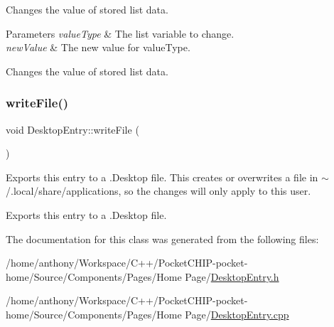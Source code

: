 Changes the value of stored list data.


\begin{DoxyParams}{Parameters}
{\em value\+Type} & The list variable to change.\\
\hline
{\em new\+Value} & The new value for value\+Type.\\
\hline
\end{DoxyParams}
Changes the value of stored list data. \mbox{\label{classDesktopEntry_acad61220143a4b154ad4a79b9ae158e8}} 
\subsubsection{\texorpdfstring{write\+File()}{writeFile()}}
{\footnotesize\ttfamily void Desktop\+Entry\+::write\+File (\begin{DoxyParamCaption}{ }\end{DoxyParamCaption})}

Exports this entry to a .Desktop file. This creates or overwrites a file in $\sim$/.local/share/applications, so the changes will only apply to this user.

Exports this entry to a .Desktop file. 

The documentation for this class was generated from the following files\+:\begin{DoxyCompactItemize}
\item 
/home/anthony/\+Workspace/\+C++/\+Pocket\+C\+H\+I\+P-\/pocket-\/home/\+Source/\+Components/\+Pages/\+Home Page/\mbox{\hyperlink{DesktopEntry_8h}{Desktop\+Entry.\+h}}\item 
/home/anthony/\+Workspace/\+C++/\+Pocket\+C\+H\+I\+P-\/pocket-\/home/\+Source/\+Components/\+Pages/\+Home Page/\mbox{\hyperlink{DesktopEntry_8cpp}{Desktop\+Entry.\+cpp}}\end{DoxyCompactItemize}
